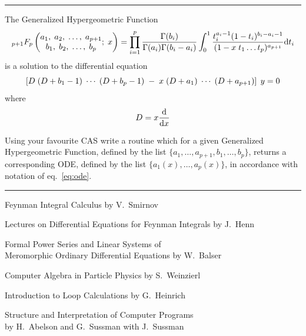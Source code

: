 \documentclass[11pt]{article}
\newcommand{\titleb}[2]{{\color{Blue}{\LARGE #1}\hfill{\Large #2}\vspace{-2mm}\par\rule{\textwidth}{1pt}\vs}}
\newcommand{\titlea}[1]{\titleb{#1}{}}
\newcommand{\people}[1]{{\color{Magenta}#1}}
\begin{document}
\titlea{Expansion of Hypergeometric Functions}
The Generalized Hypergeometric Function
$$
 _{p+1}F_p
\left(
\begin{matrix}
  a_1,\; a_2,\; \ldots,\; a_{p+1}
  \\
  b_1,\; b_2,\; \ldots,\; b_{p}
\end{matrix}
;\; x
\right)
=
\prod_{i=1}^{p}\frac{\Gamma(b_i)}{\Gamma(a_i)\Gamma(b_i-a_i)}
\int_0^1 \frac{t_i^{a_i-1} (1-t_i)^{b_i-a_i-1}}{(1-x\; t_1\ldots t_{p})^{a_{p+1}}} \mathrm{d} t_i
$$%
is a solution to the differential equation
$$
\left[
 D \; (D+b_1-1)\;\cdots\;(D+b_p-1)\; - \; x\;(D+a_1)\;\cdots\;(D+a_{p+1})
\right] \; y = 0
$$%
where
$$D = x\frac{\mathrm{d}}{\mathrm{d} x}$$

\vs
{}\par
Using your favourite CAS write a routine which for a given Generalized Hypergeometric Function, defined by the list $\{a_1,\ldots,a_{p+1},b_1,\ldots,b_p\}$, returns a corresponding ODE, defined by the list $\{a_1(x),\ldots,a_p(x)\}$, in accordance with notation of eq.~\eqref{eq:ode}.

\newpage


\titlea{Reading List}
\bi \item \people{Feynman Integral Calculus} by V.~Smirnov
    \item \people{Lectures on Differential Equations for Feynman Integrals} by J.~Henn
    \item \people{Formal Power Series and Linear Systems of \\ Meromorphic Ordinary Differential Equations} by W.~Balser
    \item \people{Computer Algebra in Particle Physics} by S.~Weinzierl
    \item \people{Introduction to Loop Calculations} by G.~Heinrich
    \item \people{Structure and Interpretation of Computer Programs}\\by H.~Abelson and G.~Sussman with J.~Sussman
    \ei
\end{document}
